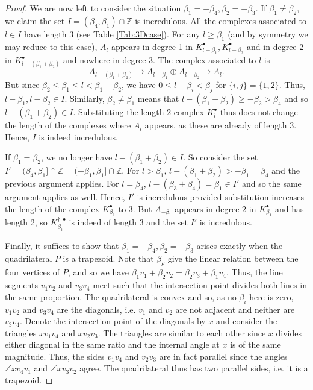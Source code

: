 \documentclass[reqno, 12pt]{amsart}
\theoremstyle{definition}
\numberwithin{equation}{section}
\newcommand{\Z}{\mathbb{Z}}
\begin{document}
\begin{proof}
We are now left to consider the situation $\beta_1=-\beta_4, \beta_2=-\beta_3$. 
If $\beta_1\neq\beta_2$, we claim the set $I=(\beta_4,\beta_1)\cap \Z$ is incredulous. All the complexes associated to $l\in I$ have length 3 (see Table \ref{Tab:3Dcase}). For any $l\ge \beta_1$ (and by symmetry we may reduce to this case), $A_l$ appears in degree 1 in $K_{l-\beta_1}^\bullet, K_{l-\beta_2}^\bullet$ and in degree 2 in $K_{l-(\beta_1+\beta_2)}^\bullet$ and nowhere in degree 3. The complex associated to $l$ is
\[A_{l-(\beta_1+\beta_2)}\rightarrow A_{l-\beta_1}\oplus A_{l-\beta_2}\rightarrow A_l.\] 
But since $\beta_2\le \beta_1\le l<\beta_1+\beta_2$, we have $0\le l-\beta_i<\beta_j$ for $\{i,j\}=\{1,2\}$. Thus, $l-\beta_1,l-\beta_2\in I$. Similarly, $\beta_2\neq \beta_1$ means that $l-(\beta_1+\beta_2)\ge -\beta_2>\beta_4$ and so $l-(\beta_1+\beta_2)\in I$. Substituting the length 2 complex $K_l^\bullet$ thus does not change the length of the complexes where $A_l$ appears, as these are already of length 3. Hence, $I$ is indeed incredulous. 

If $\beta_1=\beta_2$, we no longer have $l-(\beta_1+\beta_2)\in I$. So consider the set $I'=(\beta_4,\beta_1]\cap \Z=(-\beta_1,\beta_1]\cap \Z$. For $l>\beta_1$, $l-(\beta_1+\beta_2)>-\beta_1=\beta_4$ and the previous argument applies. For $l=\beta_4$, $l-(\beta_3+\beta_4)=\beta_1\in I'$ and so the same argument applies as well. Hence, $I'$ is incredulous provided substitution increases the length of the complex $K_{\beta_1}^\bullet$ to 3. But $A_{-\beta_1}$ appears in degree 2 in $K_{\beta_1}^\bullet$ and has length 2, so $K_{\beta_1}^{\dagger,\bullet}$ is indeed of length 3 and the set $I'$ is incredulous.

Finally, it suffices to show that $\beta_1=-\beta_4, \beta_2=-\beta_3$ arises exactly when the quadrilateral $P$ is a trapezoid. Note that $\beta_\rho$ give the linear relation between the four vertices of $P$, and so we have $\beta_1v_1+\beta_2v_2=\beta_2v_3+\beta_1v_4$. Thus, the line segments $v_1v_2$ and $v_3v_4$ meet such that the intersection point divides both lines in the same proportion. The quadrilateral is convex and so, as no $\beta_i$ here is zero, $v_1v_2$ and $v_3v_4$ are the diagonals, i.e. $v_1$ and $v_2$ are not adjacent and neither are $v_3v_4$. Denote the intersection point of the diagonals by $x$ and consider the triangles $xv_1v_4$ and $xv_2v_3$. The triangles are similar to each other since $x$ divides either diagonal in the same ratio and the internal angle at $x$ is of the same magnitude. Thus, the sides $v_1v_4$ and $v_2v_3$ are in fact parallel since the angles $\angle xv_4v_1$ and $\angle xv_3v_2$ agree. The quadrilateral thus has two parallel sides, i.e. it is a trapezoid.
\end{proof}
\end{document}
